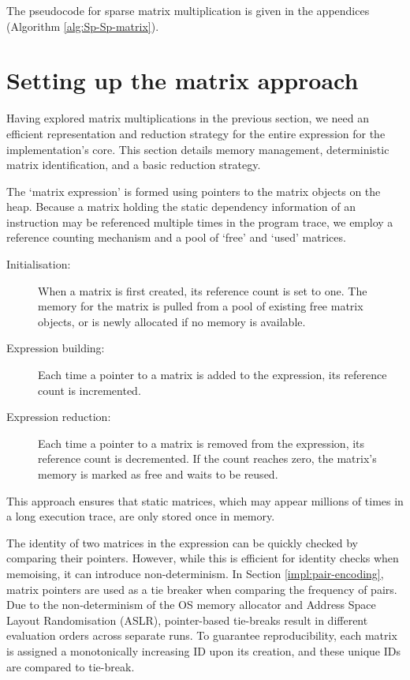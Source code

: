 The pseudocode for sparse matrix multiplication is given in the appendices (Algorithm \ref{alg:Sp-Sp-matrix}).

\FloatBarrier
\section{Setting up the matrix approach} \label{impl:matrix-approach}

Having explored matrix multiplications in the previous section, we need an efficient representation and reduction strategy
for the entire expression for the implementation's core. This section details memory management, deterministic matrix 
identification, and a basic reduction strategy. 

The `matrix expression' is formed using pointers to the matrix objects on the heap.
Because a matrix holding the static dependency information of an instruction may be referenced multiple times 
in the program trace, we employ a reference counting mechanism and a pool of `free' and `used' matrices.

\begin{description}
  \item [Initialisation:] When a matrix is first created, its reference count is set to one. The memory for the matrix 
    is pulled from a pool of existing free matrix objects, or is newly allocated if no memory is available.
  \item [Expression building:] Each time a pointer to a matrix is added to the expression, its reference count is 
    incremented.
  \item [Expression reduction:] Each time a pointer to a matrix is removed from the expression, its reference count is 
    decremented. If the count reaches zero, the matrix's memory is marked as free and waits to be reused.
\end{description}

This approach ensures that static matrices, which may appear millions of times in a long execution trace, are only stored 
once in memory. 

The identity of two matrices in the expression can be quickly checked by comparing their pointers.
However, while this is efficient for identity checks when memoising, it can introduce non-determinism.
In Section \ref{impl:pair-encoding}, matrix pointers are used as a tie breaker 
when comparing the frequency of pairs. Due to the non-determinism of the OS memory allocator and Address Space Layout
Randomisation (ASLR), pointer-based tie-breaks result in different evaluation orders across separate runs.
To guarantee reproducibility, each matrix is assigned a monotonically increasing ID upon its creation, and
these unique IDs are compared to tie-break.

